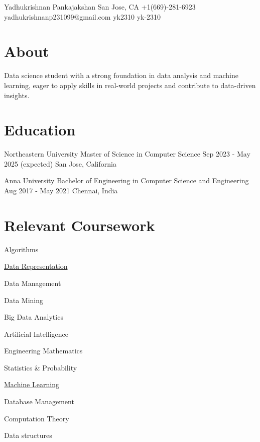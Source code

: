 \documentclass[letterpaper]{resume_config}
\begin{document}
\Header
    {Yadhukrishnan Pankajakshan} %
    {San Jose, CA} %
    {+1(669)-281-6923} %
    {yadhukrishnanp231099@gmail.com} %
    {yk2310} %
    {yk-2310} %

\section{About}
{
    Data science student with a strong foundation in data analysis and machine learning, eager to apply skills in real-world projects and contribute to data-driven insights.
}


\section{Education}

\EducationExperience
    {Northeastern University} %
    {Master of Science in Computer Science} %
    {Sep 2023 - May 2025 \footnotesize{(expected)}} %
    {San Jose, California} %

\EducationExperience
    {Anna University} %
    {Bachelor of Engineering in Computer Science and Engineering} %
    {Aug 2017 - May 2021} %
    {Chennai, India} %
\vspace{-5pt}


\section{Relevant Coursework}
\begin{SkillsList}{
    \item{Algorithms}
    \item{\href{https://coursera.org/share/60e08a9390dc0ed469da34213f7a9d9c}{Data Representation}}
    \item{Data Management}
    \item{Data Mining}
    \item{Big Data Analytics}
    \item{Artificial Intelligence}
    \item{Engineering Mathematics}
    \item{Statistics \& Probability}
    \item{\href{https://coursera.org/share/b76edb1c16934e4a06f3553c2c4e67b8}{Machine Learning}}
    \item{Database Management}
    \item{Computation Theory}
    \item{Data structures}
}
\end{SkillsList}
\end{document}
